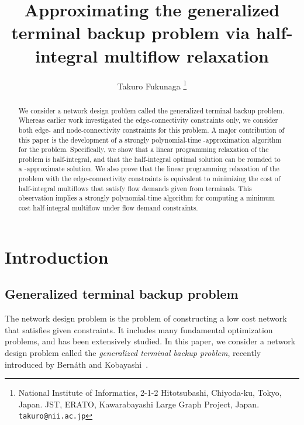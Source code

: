 \documentclass{article}
\title{Approximating the generalized terminal backup problem via
half-integral multiflow relaxation\footnotemark[2]}
\author{Takuro Fukunaga
\thanks{National Institute of Informatics,
2-1-2 Hitotsubashi, Chiyoda-ku, Tokyo, Japan.
JST, ERATO, Kawarabayashi Large Graph Project, Japan.
  {\tt takuro@nii.ac.jp}}}
\date{}
\begin{document}
\maketitle

\renewcommand{\thefootnote}{\fnsymbol{footnote}}


\begin{abstract}
We consider a network design problem called the generalized terminal backup problem.
Whereas earlier work investigated 
the edge-connectivity constraints only,
we consider both edge- and node-connectivity constraints for this problem.
A major contribution of this paper is 
the development of a strongly polynomial-time -approximation algorithm 
for the problem. Specifically,
we show that a linear programming relaxation of the problem is half-integral,
and that the half-integral optimal solution can be rounded to a -approximate solution.
We also prove that the linear programming relaxation of the problem with the edge-connectivity constraints 
is equivalent to minimizing the cost
of half-integral multiflows that satisfy flow demands given from terminals.
This observation implies a strongly polynomial-time algorithm 
for computing a minimum cost half-integral multiflow
under flow demand constraints.
\end{abstract}



\section{Introduction} 
\label{sec:introduction}

\subsection{Generalized terminal backup problem}
The network design problem is the problem of constructing a low cost network that satisfies
given constraints. It includes many fundamental optimization problems, and 
has been extensively studied. In this paper, we consider a network design problem
called the \emph{generalized terminal backup problem}, recently introduced by Bern{\'a}th and
Kobayashi~\cite{Bernath2014}. 
\end{document}
